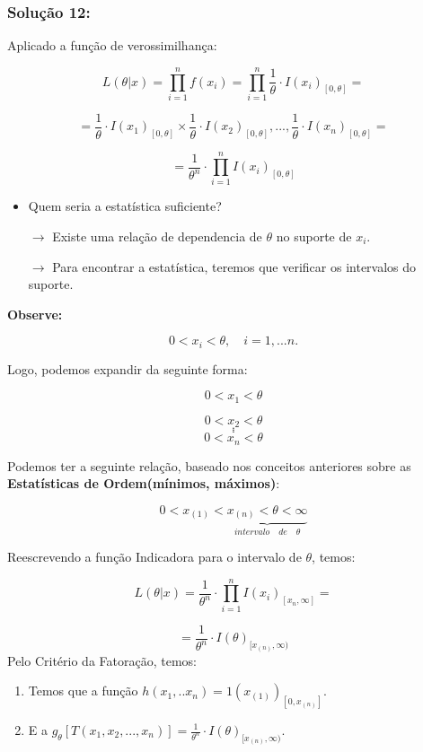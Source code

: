 \documentclass[
  letterpaper,
  DIV=11,
  numbers=noendperiod]{scrartcl}
\providecommand{\tightlist}{%
  \setlength{\itemsep}{0pt}\setlength{\parskip}{0pt}}\usepackage{longtable,booktabs,array}
\begin{document}
\subsubsection{Solução 12:}\label{soluuxe7uxe3o-12}

Aplicado a função de verossimilhança:

\[
L(\theta|x) = \prod_{i=1}^{n} f(x_i) = \prod_{i=1}^{n} \frac{1}{\theta} \cdot I(x_i)_{[0,\theta]}= 
\]

\[
=  \frac{1}{\theta} \cdot I(x_1)_{[0,\theta]} \times \frac{1}{\theta} \cdot I(x_2)_{[0,\theta]},...,\frac{1}{\theta} \cdot I(x_n)_{[0,\theta]} =
\]

\[
= \frac{1}{\theta^{n}} \cdot \prod_{i=1}^{n} I(x_i)_{[0,\theta]}
\]

\begin{itemize}
\item
  Quem seria a estatística suficiente?

  \(\rightarrow\) Existe uma relação de dependencia de \(\theta\) no
  suporte de \(x_i\).

  \(\rightarrow\) Para encontrar a estatística, teremos que verificar os
  intervalos do suporte.
\end{itemize}

\textbf{Observe:}

\[
0 < x_i < \theta, \quad i=1,...n.
\]

Logo, podemos expandir da seguinte forma:

\[
0 < x_1 < \theta
\]

\[
0 < x_2 < \theta
\] \[
.
\] \[
.
\] \[
.
\] \[
0 < x_n < \theta
\]

Podemos ter a seguinte relação, baseado nos conceitos anteriores sobre
as \textbf{Estatísticas de Ordem(mínimos, máximos)}:

\[
0 <x_{(1)} < \underbrace{x_{(n)}<\theta<\infty}_{intervalo \quad de \quad  \theta}
\]

Reescrevendo a função Indicadora para o intervalo de \(\theta\), temos:

\[
L(\theta|x) = \frac{1}{\theta^{n}} \cdot \prod_{i=1}^{n} I(x_i)_{[x_{n},\infty]} =
\]

\[
= \frac{1}{\theta^{n}} \cdot I(\theta)_{[x_{(n)}, \infty)}
\] Pelo Critério da Fatoração, temos:

\begin{enumerate}
\def\labelenumi{\arabic{enumi}.}
\tightlist
\item
  Temos que a função \(h(x_1,..x_n) = 1(x_{(1)})_{[0,x_{(n)}]}\).
\item
  E a
  \(g_\theta[T(x_1,x_2,...,x_n)]= \frac{1}{\theta^{n}} \cdot I(\theta)_{[x_{(n)}, \infty)}\).
\end{enumerate}
\end{document}
